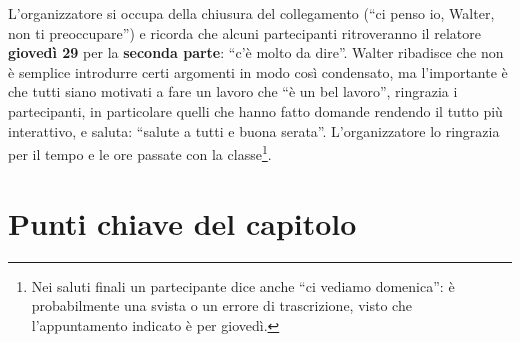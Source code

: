 L'organizzatore si occupa della chiusura del collegamento (``ci penso io,
Walter, non ti preoccupare'') e ricorda che alcuni partecipanti ritroveranno il
relatore \textbf{giovedì 29} per la \textbf{seconda parte}: ``c'è molto da
dire''. Walter ribadisce che non è semplice introdurre certi argomenti in modo
così condensato, ma l'importante è che tutti siano motivati a fare un lavoro che
``è un bel lavoro'', ringrazia i partecipanti, in particolare quelli che hanno
fatto domande rendendo il tutto più interattivo, e saluta: ``salute a tutti e
buona serata''. L'organizzatore lo ringrazia per il tempo e le ore passate con
la classe\footnote{Nei saluti finali un partecipante dice anche ``ci vediamo
domenica'': è probabilmente una svista o un errore di trascrizione, visto che
l'appuntamento indicato è per giovedì.}.

\section*{Punti chiave del capitolo}


